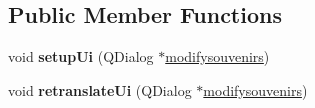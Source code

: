 \subsection*{Public Member Functions}
\begin{DoxyCompactItemize}
\item 
\mbox{\label{class_ui__modifysouvenirs_a65a331835a231045990275798a7e8df0}} 
void {\bfseries setup\+Ui} (Q\+Dialog $\ast$\hyperlink{classmodifysouvenirs}{modifysouvenirs})
\item 
\mbox{\label{class_ui__modifysouvenirs_a151a961dcf5b8f9a622d3d53619f8c35}} 
void {\bfseries retranslate\+Ui} (Q\+Dialog $\ast$\hyperlink{classmodifysouvenirs}{modifysouvenirs})
\end{DoxyCompactItemize}
